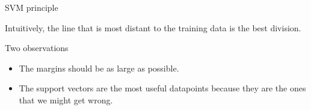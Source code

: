 \documentclass[compress]{beamer}
\begin{document}
\begin{frame}{SVM principle}
\begin{center}
{{\begin{tikzpicture}[>=latex]
            \end{tikzpicture}
        }
        }
    \end{center}

 {

Intuitively, the line that is most distant to the training data is the
best division.


}
 {
Two observations

\begin{itemize}

\item The margins should be as large as possible.
\item The support vectors are the most useful datapoints because they are
  the ones that we might get wrong.
\end{itemize}

}

\end{frame}
\end{document}
